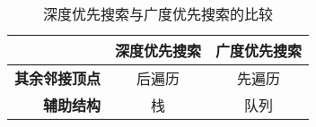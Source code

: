 


\begin{frame}
    \frametitle{\insertsectionhead}
    \begin{table}
        \centering\small
        \caption{深度优先搜索与广度优先搜索的比较}
        \label{tab:dfs_vs_bfs}
        \begin{tabular}{rcc}
            \toprule
                            & \textbf{深度优先搜索} & \textbf{广度优先搜索} \\
            \midrule
            \textbf{其余邻接顶点} & 后遍历             & 先遍历             \\
            \textbf{辅助结构}   & 栈               & 队列              \\
            \bottomrule
        \end{tabular}
    \end{table}
\end{frame}